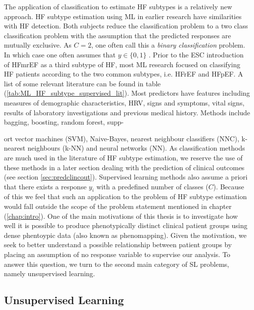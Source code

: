 \documentclass[../thesis.tex]{subfiles}
\begin{document}
\indent The application of classification to estimate HF subtypes is a relatively new approach. HF subtype estimation using ML in earlier research have similarities with HF detection. Both subjects reduce the classification problem to a two class classification problem with the assumption that the predicted responses are mutually exclusive. As $C = 2$, one often call this a \textit{binary classification} problem. In which case one often assumes that $y \in \{0,1\}$ \citep{muphy2012machine}. Prior to the ESC introduction of HFmrEF as a third subtype of HF, most ML research focused on classifying HF patients according to the two common subtypes, i.e. HFrEF and HFpEF. A list of some relevant literature can be found in table (\ref{tab:ML_HF_subtype_supervised_lit}). Most predictors have features including measures of demographic characteristics, HRV, signs and symptoms, vital signs, results of laboratory investigations and previous medical history. Methods include bagging, boosting, random forest, supp-



\noindent ort vector machines (SVM), Naive-Bayes, nearest neighbour classifiers (NNC), k-nearest neighbours (k-NN) and neural networks (NN). As classification methods are much used in the literature of HF subtype estimation, we reserve the use of these methods in a later section dealing with the prediction of clinical outcomes (see section \ref{sec:predclincout}). Supervised learning methods also assume a priori that there exists a response $y_i$ with a predefined number of classes ($C$). Because of this we feel that such an application to the problem of HF subtype estimation would fall outside the scope of the problem statement mentioned in chapter (\ref{chap:intro}). One of the main motivations of this thesis is to investigate how well it is possible to produce phenotypically distinct clinical patient groups using dense phentoypic data (also known as phenomapping). Given the motivation, we seek to better understand a possible relationship between patient groups by placing an assumption of no response variable to supervise our analysis. To answer this question, we turn to the second main category of SL problems, namely unsupervised learning.


\subsection{Unsupervised Learning}
\label{subsec:unsupervisedlearn}
\end{document}
